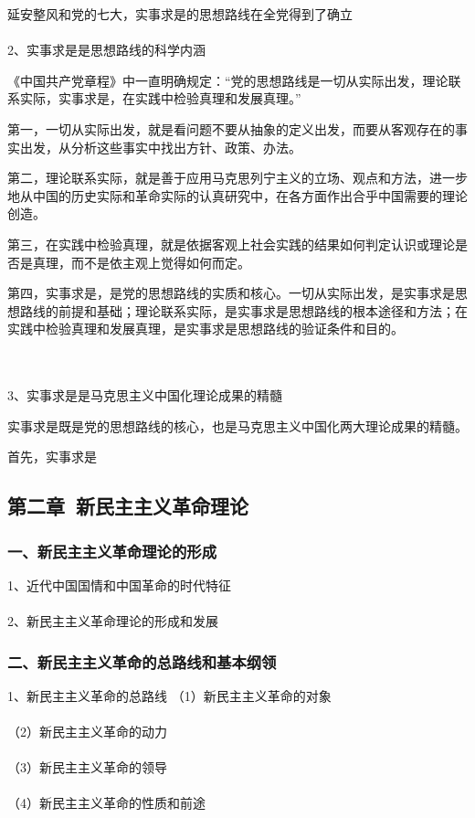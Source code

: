 \documentclass{ctexart}
\begin{document}
延安整风和党的七大，实事求是的思想路线在全党得到了确立
\\\\

2、实事求是是思想路线的科学内涵

《中国共产党章程》中一直明确规定：“党的思想路线是一切从实际出发，理论联系实际，实事求是，在实践中检验真理和发展真理。”

第一，一切从实际出发，就是看问题不要从抽象的定义出发，而要从客观存在的事实出发，从分析这些事实中找出方针、政策、办法。

第二，理论联系实际，就是善于应用马克思列宁主义的立场、观点和方法，进一步地从中国的历史实际和革命实际的认真研究中，在各方面作出合乎中国需要的理论创造。

第三，在实践中检验真理，就是依据客观上社会实践的结果如何判定认识或理论是否是真理，而不是依主观上觉得如何而定。

第四，实事求是，是党的思想路线的实质和核心。一切从实际出发，是实事求是思想路线的前提和基础；理论联系实际，是实事求是思想路线的根本途径和方法；在实践中检验真理和发展真理，是实事求是思想路线的验证条件和目的。


\\\\

3、实事求是是马克思主义中国化理论成果的精髓

实事求是既是党的思想路线的核心，也是马克思主义中国化两大理论成果的精髓。

首先，实事求是

\subsection{第二章\ 新民主主义革命理论}
\subsubsection{一、新民主主义革命理论的形成}
1、近代中国国情和中国革命的时代特征
\\\\

2、新民主主义革命理论的形成和发展


\subsubsection{二、新民主主义革命的总路线和基本纲领}
1、新民主主义革命的总路线
（1）新民主主义革命的对象
\\\\
（2）新民主主义革命的动力
\\\\
（3）新民主主义革命的领导
\\\\
（4）新民主主义革命的性质和前途
\\\\
\end{document}
